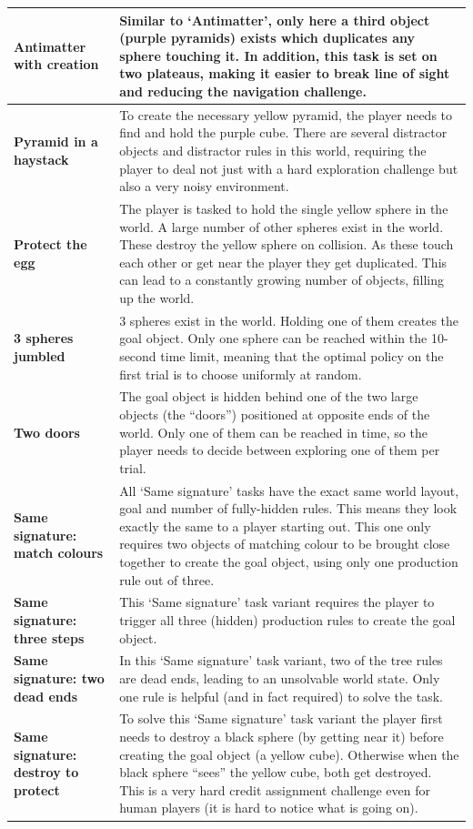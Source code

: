 \documentclass[11pt, a4paper, logo, copyright]{deepmind}
\begin{document}
\begin{appendix}
\begin{longtable}{|>{\raggedright}p{4cm}|p{12cm}|}
\textbf{Antimatter with creation} & Similar to `Antimatter', only here a third object (purple pyramids) exists which duplicates any sphere touching it. In addition, this task is set on two plateaus, making it easier to break line of sight and reducing the navigation challenge. \\ \hline
\textbf{Pyramid in a haystack} & To create the necessary yellow pyramid, the player needs to find and hold the purple cube. There are several distractor objects and distractor rules in this world, requiring the player to deal not just with a hard exploration challenge but also a very noisy environment. \\ \hline
\textbf{Protect the egg} & The player is tasked to hold the single yellow sphere in the world. A large number of other spheres exist in the world. These destroy the yellow sphere on collision. As these touch each other or get near the player they get duplicated. This can lead to a constantly growing number of objects, filling up the world. \\ \hline
\textbf{3 spheres jumbled} & 3 spheres exist in the world. Holding one of them creates the goal object. Only one sphere can be reached within the 10-second time limit, meaning that the optimal policy on the first trial is to choose uniformly at random. \\ \hline
\textbf{Two doors} & The goal object is hidden behind one of the two large objects (the ``doors'') positioned at opposite ends of the world. Only one of them can be reached in time, so the player needs to decide between exploring one of them per trial. \\ \hline
\textbf{Same signature: match colours} & All `Same signature' tasks have the exact same world layout, goal and number of fully-hidden rules. This means they look exactly the same to a player starting out. This one only requires two objects of matching colour to be brought close together to create the goal object, using only one production rule out of three. \\ \hline
\textbf{Same signature: three steps} & This `Same signature' task variant requires the player to trigger all three (hidden) production rules to create the goal object. \\ \hline
\textbf{Same signature: two dead ends} & In this `Same signature' task variant, two of the tree rules are dead ends, leading to an unsolvable world state. Only one rule is helpful (and in fact required) to solve the task. \\ \hline
\textbf{Same signature: destroy to protect} & To solve this `Same signature' task variant the player first needs to destroy a black sphere (by getting near it) before creating the goal object (a yellow cube). Otherwise when the black sphere ``sees'' the yellow cube, both get destroyed. This is a very hard credit assignment challenge even for human players (it is hard to notice what is going on). \\ \hline

\end{longtable}
\end{appendix}
\end{document}
